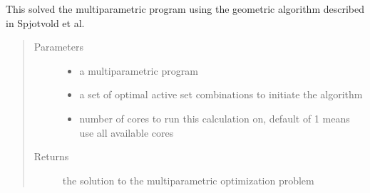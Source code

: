 \documentclass[letterpaper,10pt,english]{sphinxmanual}
\begin{document}
\begin{fulllineitems}
\label{\detokenize{ppopt.mp_solvers:ppopt.mp_solvers.mpqp_parallel_geometric_exp.solve}}
\sphinxAtStartPar
This solved the multiparametric program using the geometric algorithm described in Spjotvold et al.

\sphinxAtStartPar
{}
\begin{quote}\begin{description}
\item[{Parameters}] \leavevmode\begin{itemize}
\item {} 
\sphinxAtStartPar
{} \textendash{} a multiparametric program

\item {} 
\sphinxAtStartPar
{} \textendash{} a set of optimal active set combinations to initiate the algorithm

\item {} 
\sphinxAtStartPar
{} \textendash{} number of cores to run this calculation on, default of \sphinxhyphen{}1 means use all available cores

\end{itemize}

\item[{Returns}] \leavevmode
\sphinxAtStartPar
the solution to the multiparametric optimization problem

\end{description}\end{quote}

\end{fulllineitems}
\end{document}
